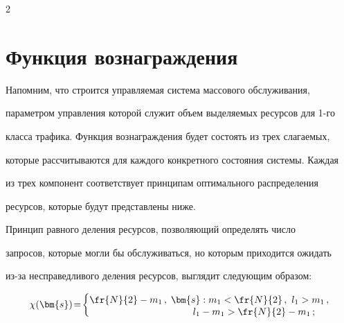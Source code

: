 \begin{multicols}{2}
\vspace*{-12pt}


  


  \section{Функция вознаграждения}


  


  \vspace*{-4pt}


  


  Напомним, что строится управляемая система массового обслуживания, 


параметром управления которой служит объем выделяемых ресурсов для \mbox{1-го} 


класса трафика. Функция вознаграждения будет состоять из трех слагаемых, 


которые рассчитываются для каждого конкретного состояния системы. Каждая 


из трех компонент соответствует принципам оптимального распределения 


ресурсов, которые будут представлены ниже.


  


  Принцип равного деления ресурсов, позволяющий определять число 


запросов, которые могли бы обслуживаться, но которым приходится ожидать 


из-за несправедливого деления ресурсов, выглядит следующим образом:





\vspace*{-4pt}





  \begin{equation*}


  \chi(\bm{s})\!=\! \begin{cases}


  \fr{N}{2}-m_1\,, & \hspace*{-2mm} \bm{s}: m_1<\fr{N}{2}\,,\ l_1>m_1\,,\\[-2pt]


  & \hspace*{6mm}l_1-m_1> \fr{N}{2}- m_1\,;\\[-2pt]



\end{cases}
\end{equation*}
\end{multicols}

